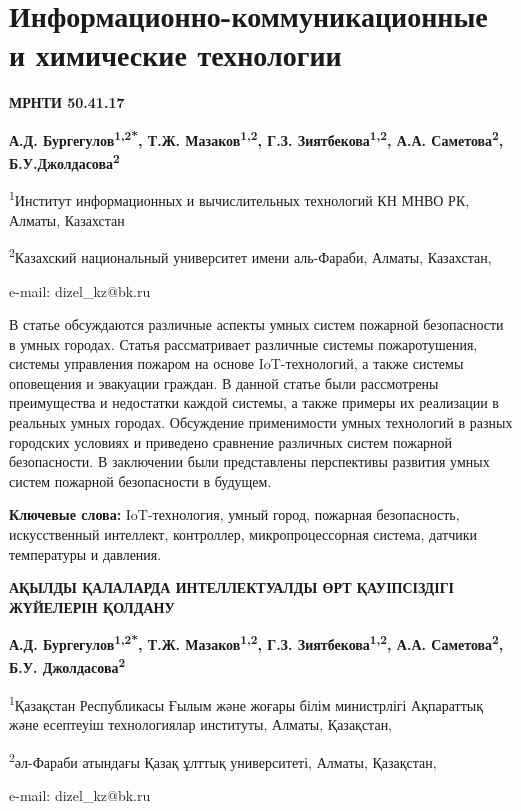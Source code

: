 \let\cleardoublepage\clearpage
\chapter{Информационно-коммуникационные и химические технологии}

{\bfseries МРНТИ 50.41.17}

\begin{center}
{\bfseries А.Д. Бургегулов\textsuperscript{1,2*}, Т.Ж.
Мазаков\textsuperscript{1,2}, Г.З. Зиятбекова\textsuperscript{1,2}, А.А.
Саметова\textsuperscript{2}, Б.У.Джолдасова\textsuperscript{2}}

\textsuperscript{1}Институт информационных и вычислительных технологий
КН МНВО РК, Алматы, Казахстан

\textsuperscript{2}Казахский национальный университет имени аль-Фараби,
Алматы, Казахстан,

e-mail: dizel\_kz@bk.ru
\end{center}

В статье обсуждаются различные аспекты умных систем пожарной
безопасности в умных городах. Статья рассматривает различные системы
пожаротушения, системы управления пожаром на основе IoT-технологий, а
также системы оповещения и эвакуации граждан. В данной статье были
рассмотрены преимущества и недостатки каждой системы, а также примеры их
реализации в реальных умных городах. Обсуждение применимости умных
технологий в разных городских условиях и приведено сравнение различных
систем пожарной безопасности. В заключении были представлены перспективы
развития умных систем пожарной безопасности в будущем.

{\bfseries Ключевые слова:} IoT-технология, умный город, пожарная
безопасность, искусственный интеллект, контроллер, микропроцессорная
система, датчики температуры и давления.

\begin{center}
{\large\bfseries АҚЫЛДЫ ҚАЛАЛАРДА ИНТЕЛЛЕКТУАЛДЫ ӨРТ ҚАУІПСІЗДІГІ ЖҮЙЕЛЕРІН ҚОЛДАНУ}

\vspace{1em}
{\bfseries А.Д. Бургегулов\textsuperscript{1,2*}, Т.Ж.
Мазаков\textsuperscript{1,2}, Г.З. Зиятбекова\textsuperscript{1,2}, А.А.
Саметова\textsuperscript{2}, Б.У. Джолдасова\textsuperscript{2}}

\textsuperscript{1}Қазақстан Республикасы Ғылым және жоғары білім
министрлігі Ақпараттық және есептеуіш технологиялар институты, Алматы,
Қазақстан,

\textsuperscript{2}әл-Фараби атындағы Қазақ ұлттық университеті, Алматы,
Қазақстан,

e-mail: dizel\_kz@bk.ru
\end{center}

